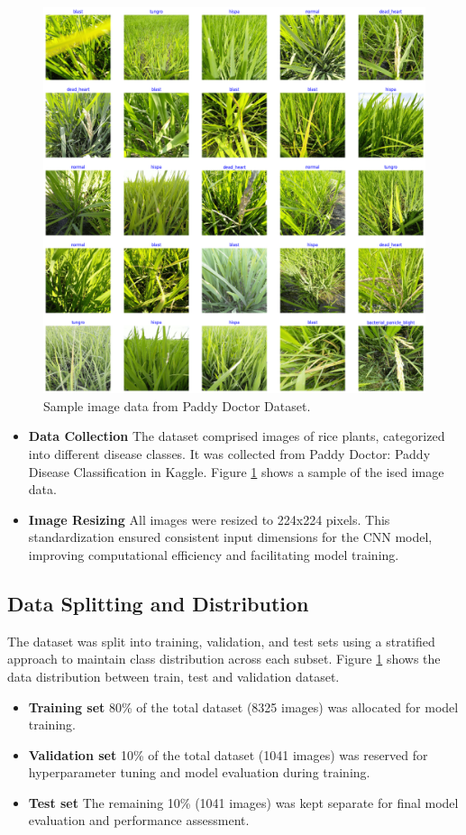 \documentclass[conference]{IEEEtran}
\begin{document}
\begin{figure}[H]
    \centerline{\includegraphics[width=\linewidth]{fig2.png}}
    \caption{Sample image data from Paddy Doctor Dataset.}
    \label{fig2}
\end{figure}

\begin{itemize}
    \item \textbf{Data Collection} The dataset comprised images of rice plants, categorized into different disease classes. It was collected from Paddy Doctor: Paddy Disease Classification in Kaggle. Figure \ref{fig2} shows a sample of the ised image data.
    \item \textbf{Image Resizing} All images were resized to 224x224 pixels. This standardization ensured consistent input dimensions for the CNN model, improving computational efficiency and facilitating model training.
\end{itemize}

\subsection{Data Splitting and Distribution}
The dataset was split into training, validation, and test sets using a stratified approach to maintain class distribution across each subset. Figure \ref{fig2} shows the data distribution between train, test and validation dataset.
\begin{itemize}
    \item \textbf{Training set} 80\% of the total dataset (8325 images) was allocated for model training.
    \item \textbf{Validation set} 10\% of the total dataset (1041 images) was reserved for hyperparameter tuning and model evaluation during training.
    \item \textbf{Test set} The remaining 10\% (1041 images) was kept separate for final model evaluation and performance assessment.
\end{itemize}
\end{document}
